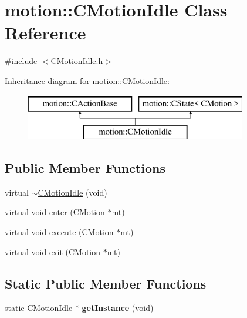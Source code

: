 \hypertarget{classmotion_1_1CMotionIdle}{}\section{motion\+:\+:C\+Motion\+Idle Class Reference}
\label{classmotion_1_1CMotionIdle}


{\ttfamily \#include $<$C\+Motion\+Idle.\+h$>$}

Inheritance diagram for motion\+:\+:C\+Motion\+Idle\+:\begin{figure}[H]
\begin{center}
\leavevmode
\includegraphics[height=2.000000cm]{classmotion_1_1CMotionIdle}
\end{center}
\end{figure}
\subsection*{Public Member Functions}
\begin{DoxyCompactItemize}
\item 
virtual \mbox{\hyperlink{classmotion_1_1CMotionIdle_a45b57a25a1b53c585fc2ef648dc1ec4a}{$\sim$\+C\+Motion\+Idle}} (void)
\item 
virtual void \mbox{\hyperlink{classmotion_1_1CMotionIdle_adf54cf3d93e54060a3060017e55ea706}{enter}} (\mbox{\hyperlink{classmotion_1_1CMotion}{C\+Motion}} $\ast$mt)
\item 
virtual void \mbox{\hyperlink{classmotion_1_1CMotionIdle_aad314bae00925e2fdbbf8e93fff08b9a}{execute}} (\mbox{\hyperlink{classmotion_1_1CMotion}{C\+Motion}} $\ast$mt)
\item 
virtual void \mbox{\hyperlink{classmotion_1_1CMotionIdle_a2488eb5516673fd8e188da01a9e4bc51}{exit}} (\mbox{\hyperlink{classmotion_1_1CMotion}{C\+Motion}} $\ast$mt)
\end{DoxyCompactItemize}
\subsection*{Static Public Member Functions}
\begin{DoxyCompactItemize}
\item 
\mbox{\label{classmotion_1_1CMotionIdle_acbd0fc59cc7ee93ec4a13049d7e1f419}} 
static \mbox{\hyperlink{classmotion_1_1CMotionIdle}{C\+Motion\+Idle}} $\ast$ {\bfseries get\+Instance} (void)
\end{DoxyCompactItemize}


